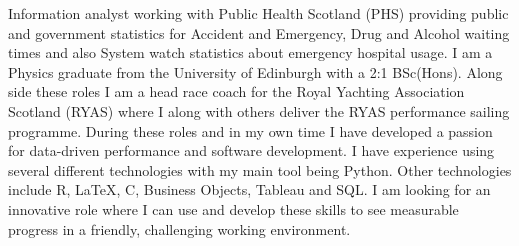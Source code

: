 

\begin{cvparagraph}
Information analyst working with Public Health Scotland (PHS) providing public and government statistics for Accident and Emergency, Drug and Alcohol waiting times and also System watch statistics about emergency hospital usage. I am a Physics graduate from the University of Edinburgh with a 2:1 BSc(Hons). Along side these roles I am a head race coach for the Royal Yachting Association Scotland (RYAS) where I along with others deliver the RYAS performance sailing programme. During these roles and in my own time I have developed a passion for data-driven performance and software development. I have experience using several different technologies with my main tool being Python. Other technologies include R, LaTeX, C, Business Objects, Tableau and SQL. I am looking for an innovative role where I can use and develop these skills to see measurable progress in a friendly, challenging working environment.

\end{cvparagraph}

